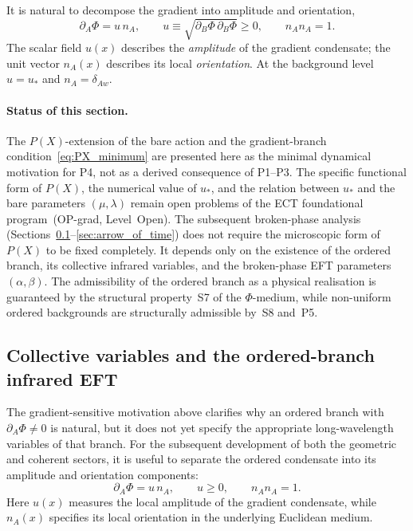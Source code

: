 \documentclass[11pt,a4paper]{article}
\numberwithin{equation}{section}
\begin{document}
It is natural to decompose the gradient into amplitude and orientation,
\begin{equation}
  \partial_A\Phi = u\,n_A,
  \qquad
  u \equiv \sqrt{\partial_B\Phi\,\partial_B\Phi} \geq 0,
  \qquad
  n_A n_A = 1.
  \label{eq:amplitude_orientation}
\end{equation}
The scalar field $u(x)$ describes the \emph{amplitude} of the gradient
condensate; the unit vector $n_A(x)$ describes its local
\emph{orientation}.  At the background level $u = u_*$ and
$n_A = \delta_{Aw}$.

\paragraph{Status of this section.}
The $P(X)$-extension of the bare action and the gradient-branch
condition~\eqref{eq:PX_minimum} are presented here as the minimal
dynamical motivation for P4, not as a derived consequence of P1--P3.
The specific functional form of $P(X)$, the numerical value of $u_*$,
and the relation between $u_*$ and the bare parameters $(\mu,\lambda)$
remain open problems of the ECT foundational program~(OP-grad,
Level~Open).  The subsequent broken-phase analysis
(Sections~\ref{sec:ordered_branch_eft}--\ref{sec:arrow_of_time})
does not require the microscopic form of $P(X)$ to be fixed completely.
It depends only on the existence of the ordered branch, its collective
infrared variables, and the broken-phase EFT parameters $(\alpha,\beta)$.
The admissibility of the ordered branch as a physical realisation
is guaranteed by the structural property~S7 of the $\Phi$-medium,
while non-uniform ordered backgrounds are structurally admissible
by~S8 and~P5.

\subsection{Collective variables and the ordered-branch infrared EFT}
\label{sec:ordered_branch_eft}

The gradient-sensitive motivation above clarifies why an ordered branch
with $\partial_A\Phi\neq 0$ is natural, but it does not yet specify
the appropriate long-wavelength variables of that branch.
For the subsequent development of both the geometric and coherent sectors,
it is useful to separate the ordered condensate into its amplitude and
orientation components:
\begin{equation}
  \partial_A\Phi = u\,n_A,
  \qquad
  u \ge 0,
  \qquad
  n_A n_A = 1.
  \label{eq:ordered_branch_decomposition}
\end{equation}
Here $u(x)$ measures the local amplitude of the gradient condensate,
while $n_A(x)$ specifies its local orientation in the underlying
Euclidean medium.
\end{document}
